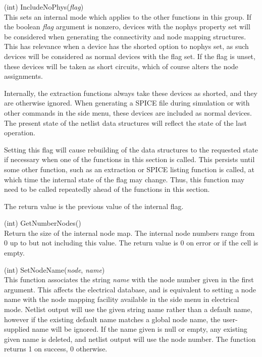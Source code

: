 \begin{description}
\item{(int) \vt IncludeNoPhys({\it flag\/})}\\
This sets an internal mode which applies to the other functions in
this group.  If the boolean {\it flag} argument is nonzero, devices
with the {\et nophys} property set will be considered when generating
the connectivity and node mapping structures.  This has relevance when
a device has the shorted option to {\et nophys} set, as such devices
will be considered as normal devices with the flag set.  If the flag
is unset, these devices will be taken as short circuits, which of
course alters the node assignments.

Internally, the extraction functions always take these devices as
shorted, and they are otherwise ignored.  When generating a SPICE file
during simulation or with other commands in the side menu, these
devices are included as normal devices.  The present state of the
netlist data structures will reflect the state of the last operation.

Setting this flag will cause rebuilding of the data structures to the
requested state if necessary when one of the functions in this section
is called.  This persists until some other function, such as an
extraction or SPICE listing function is called, at which time the
internal state of the flag may change.  Thus, this function may need
to be called repeatedly ahead of the functions in this section.

The return value is the previous value of the internal flag.

\item{(int) \vt GetNumberNodes()}\\
Return the size of the internal node map.  The internal node numbers
range from 0 up to but not including this value.  The return value is
0 on error or if the cell is empty.

\item{(int) \vt SetNodeName({\it node}, {\it name\/})}\\
This function associates the string {\it name} with the node number
given in the first argument.  This affects the electrical database,
and is equivalent to setting a node name with the node mapping
facility available in the side menu in electrical mode.  Netlist
output will use the given string name rather than a default name,
however if the existing default name matches a global node name, the
user-supplied name will be ignored.  If the name given is null or
empty, any existing given name is deleted, and netlist output will use
the node number.  The function returns 1 on success, 0 otherwise.


\end{description}
